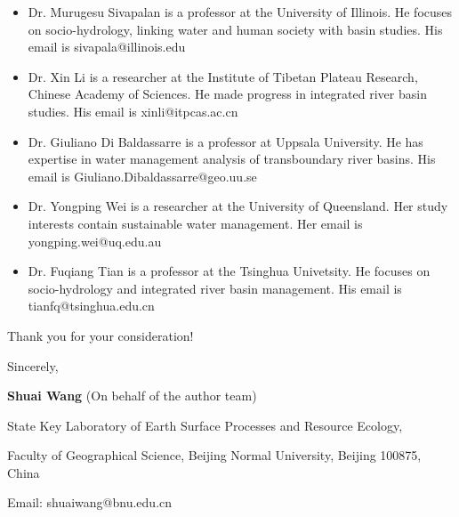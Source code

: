 \documentclass[11pt,a4paper,roman]{moderncv}
\begin{document}
\begin{itemize}
    \item Dr. Murugesu Sivapalan is a professor at the University of Illinois. He focuses on socio-hydrology, linking water and human society with basin studies. His email is sivapala@illinois.edu
    \item Dr. Xin Li is a researcher at the Institute of Tibetan Plateau Research, Chinese Academy of Sciences. He made progress in integrated river basin studies. His email is xinli@itpcas.ac.cn
    \item Dr. Giuliano Di Baldassarre is a professor at Uppsala University. He has expertise in water management analysis of transboundary river basins. His email is Giuliano.Dibaldassarre@geo.uu.se
    \item Dr. Yongping Wei is a researcher at the University of Queensland. Her study interests contain sustainable water management. Her email is yongping.wei@uq.edu.au
    \item Dr. Fuqiang Tian is a professor at the Tsinghua Univetsity. He focuses on socio-hydrology and integrated river basin management. His email is tianfq@tsinghua.edu.cn
\end{itemize}

\vspace{0.5cm}

Thank you for your consideration!

\vspace{0.5cm}

Sincerely,

\textbf{Shuai Wang} (On behalf of the author team)


State Key Laboratory of Earth Surface Processes and Resource Ecology,

Faculty of Geographical Science, Beijing Normal University, Beijing 100875, China

Email: shuaiwang@bnu.edu.cn
\end{document}
